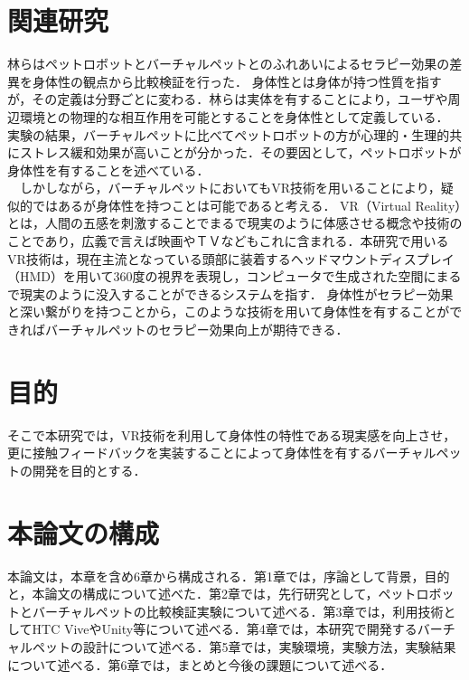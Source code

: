 \section{関連研究}
林らはペットロボットとバーチャルペットとのふれあいによるセラピー効果の差異を身体性の観点から比較検証を行った．
身体性とは身体が持つ性質を指すが，その定義は分野ごとに変わる．林らは実体を有することにより，ユーザや周辺環境との物理的な相互作用を可能とすることを身体性として定義している．
実験の結果，バーチャルペットに比べてペットロボットの方が心理的・生理的共にストレス緩和効果が高いことが分かった．その要因として，ペットロボットが身体性を有することを述べている．\\
　しかしながら，バーチャルペットにおいてもVR技術を用いることにより，疑似的ではあるが身体性を持つことは可能であると考える．
VR（Virtual Reality）とは，人間の五感を刺激することでまるで現実のように体感させる概念や技術のことであり，広義で言えば映画やＴＶなどもこれに含まれる．本研究で用いるVR技術は，現在主流となっている頭部に装着するヘッドマウントディスプレイ（HMD）を用いて360度の視界を表現し，コンピュータで生成された空間にまるで現実のように没入することができるシステムを指す．
身体性がセラピー効果と深い繋がりを持つことから，このような技術を用いて身体性を有することができればバーチャルペットのセラピー効果向上が期待できる．


\section{目的}
そこで本研究では，VR技術を利用して身体性の特性である現実感を向上させ，更に接触フィードバックを実装することによって身体性を有するバーチャルペットの開発を目的とする．


\section{本論文の構成}
本論文は，本章を含め6章から構成される．第1章では，序論として背景，目的と，本論文の構成について述べた．第2章では，先行研究として，ペットロボットとバーチャルペットの比較検証実験について述べる．第3章では，利用技術としてHTC ViveやUnity等について述べる．第4章では，本研究で開発するバーチャルペットの設計について述べる．第5章では，実験環境，実験方法，実験結果について述べる．第6章では，まとめと今後の課題について述べる．